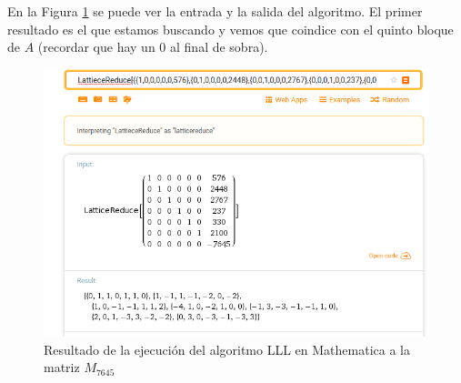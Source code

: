 \documentclass[12pt]{article}
\begin{document}
En la Figura \ref{wolfram} se puede ver la entrada y la salida del algoritmo. El primer resultado es el que estamos buscando y vemos que coindice con el quinto bloque de $A$ (recordar que hay un 0 al final de sobra).

\begin{figure}
	\includegraphics[scale=0.7]{salida_lll}
	\caption{Resultado de la ejecución del algoritmo LLL en Mathematica a la matriz $M_{7645}$}
	\label{wolfram}
\end{figure}




 
\end{document}
